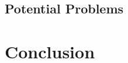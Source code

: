 \documentclass[a4paper]{article}
\newcommand*{\ShowReferences}{} %
\begin{document}

\subsection{Potential Problems} %
\label{sec:potentialProblems}



\section{Conclusion} %
\label{sec:conclusion}



\ifdefined\ShowReferences
  \newpage
  
  {} %
\fi

\ifdefined\ShowGlossary
  \clearpage
  \printnoidxglossary[sort=letter]
\fi

\end{document}
